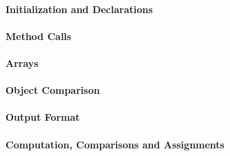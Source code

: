 
\paragraph{Initialization and Declarations}
\begin{itemize}
\end{itemize}

\paragraph{Method Calls}
\begin{itemize}
\end{itemize}

\paragraph{Arrays}
\begin{itemize}
\end{itemize}

\paragraph{Object Comparison}
\begin{itemize}
\end{itemize}

\paragraph{Output Format}
\begin{itemize}
\end{itemize}

\paragraph{Computation, Comparisons and Assignments}
\begin{itemize}
\end{itemize}

